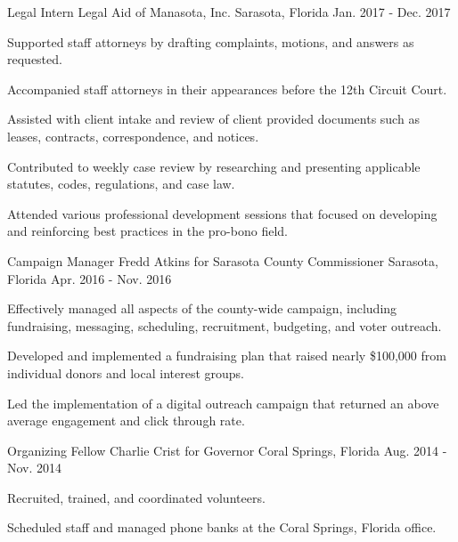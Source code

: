 \begin{cventries}
  \cventry
    {Legal Intern} %
    {Legal Aid of Manasota, Inc.} %
    {Sarasota, Florida} %
    {Jan. 2017 - Dec. 2017} %
    {
      \begin{cvitems} %
        \item {Supported staff attorneys by drafting complaints, motions, and answers as requested.}
        \item {Accompanied staff attorneys in their appearances before the 12th Circuit Court.}
        \item {Assisted with client intake and review of client provided documents such as leases, contracts, correspondence, and notices.}
        \item {Contributed to weekly case review by researching and presenting applicable statutes, codes, regulations, and case law.}
        \item {Attended various professional development sessions that focused on developing and reinforcing best practices in the pro-bono field.}
      \end{cvitems}
    }

  \cventry
    {Campaign Manager} %
    {Fredd Atkins for Sarasota County Commissioner} %
    {Sarasota, Florida} %
    {Apr. 2016 - Nov. 2016} %
    {
      \begin{cvitems} %
        \item {Effectively managed all aspects of the county-wide campaign, including fundraising, messaging, scheduling, recruitment, budgeting, and voter outreach.}
        \item {Developed and implemented a fundraising plan that raised nearly \$100,000 from individual donors and local interest groups.}
        \item {Led the implementation of a digital outreach campaign that returned an above average engagement and click through rate.}
      \end{cvitems}
    }

  \cventry
    {Organizing Fellow} %
    {Charlie Crist for Governor} %
    {Coral Springs, Florida} %
    {Aug. 2014 - Nov. 2014} %
    {
      \begin{cvitems} %
        \item {Recruited, trained, and coordinated volunteers.}
        \item {Scheduled staff and managed phone banks at the Coral Springs, Florida office.}
      \end{cvitems}
    }

\end{cventries}

